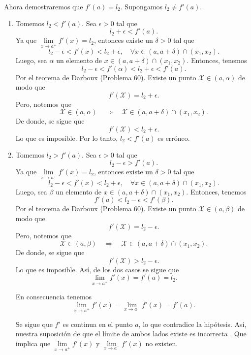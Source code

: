 \begin{enumerate}[\bfseries 1.]
\begin{enumerate}[(a)]
\begin{enumerate}
		    Ahora demostraremos que $f'(a)=l_2$. Supongamos $l_2\neq f'(a).$\\

		    \begin{enumerate}
			\item Tomemos $l_2<f'(a)$. Sea $\epsilon>0$ tal que
			$$l_2+\epsilon<f'(a).$$
			Ya que $\lim\limits_{x\to a^+}f'(x)=l_2$, entonces existe un $\delta>0$ tal que
			$$l_2-\epsilon<f'(x)<l_2+\epsilon,\quad \forall x\in (a,a+\delta)\cap(x_1,x_2).$$
			Luego, sea $\alpha$ un elemento de $x\in (a,a+\delta)\cap(x_1,x_2)$. Entonces, tenemos
			$$l_2-\epsilon<f'(\alpha)<l_2+\epsilon<f'(a).$$
			Por el teorema de Darboux (Problema 60). Existe un punto $\mathcal{X}\in (a,\alpha)$ de modo que
			$$f'\left(\mathcal{X}\right)=l_2+\epsilon.$$
			Pero, notemos que
			$$\mathcal{X}\in \left(a,\alpha\right)\quad\Rightarrow \quad \mathcal{X}\in (a,a+\delta)\cap (x_1,x_2).$$
			De donde, se sigue que
			$$f'\left(\mathcal{X}\right)<l_2+\epsilon.$$
			Lo que es imposible. Por lo tanto, $l_2<f'(a)$ es erróneo.\\

			\item Tomemos $l_2>f'(a)$. Sea $\epsilon>0$ tal que
			$$l_2-\epsilon>f'(a).$$
			Ya que $\lim\limits_{x\to a^+}f'(x)=l_2$, entonces existe un $\delta>0$ tal que
			$$l_2-\epsilon<f'(x)<l_2+\epsilon,\quad \forall x\in (a,a+\delta)\cap(x_1,x_2).$$
			Luego, sea $\beta$ un elemento de $x\in (a,a+\delta)\cap(x_1,x_2)$. Entonces, tenemos
			$$f'(a)<l_2-\epsilon<f'(\beta).$$
			Por el teorema de Darboux (Problema 60). Existe un punto $\mathcal{X}\in (a,\beta)$ de modo que
			$$f'\left(\mathcal{X}\right)=l_2-\epsilon.$$
			Pero, notemos que
			$$\mathcal{X}\in \left(a,\beta\right)\quad\Rightarrow \quad \mathcal{X}\in (a,a+\delta)\cap (x_1,x_2).$$
			De donde, se sigue que
			$$f'\left(\mathcal{X}\right)>l_2-\epsilon.$$
			Lo que es imposible. Así, de los dos casos se sigue que
			$$\lim_{x\to a^+}f'(x)=f'(a)=l_2.$$

			En consecuencia tenemos 
			$$\lim_{x\to a^+}f'(x)=\lim_{x\to a^-}f'(x)=f'(a).$$

			Se sigue que $f'$ es continua en el punto $a$, lo que contradice la hipótesis. Así, nuestra suposición de que el límite de ambos lados existe es incorrecta . Que implica que $\lim\limits_{x\to a^+}f'(x)$ y $\lim\limits_{x\to a^-}f'(x)$ no existen.\\\\

		    \end{enumerate}


\end{enumerate}
\end{enumerate}
\end{enumerate}
